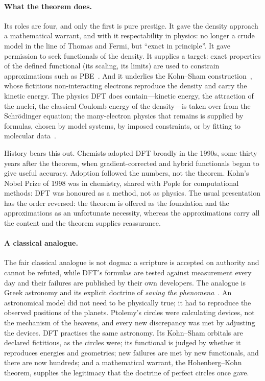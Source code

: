 \documentclass[11pt]{article}
\begin{document}
\paragraph{What the theorem does.} Its roles are four, and only the first is pure prestige. It gave the
density approach a mathematical warrant, and with it respectability in physics: no longer a crude model
in the line of Thomas and Fermi, but ``exact in principle''. It gave permission to seek functionals of the
density. It supplies a target: exact properties of the defined functional (its scaling, its limits) are
used to constrain approximations such as PBE~\cite{pbe}. And it underlies the Kohn--Sham
construction~\cite{ks}, whose fictitious non-interacting electrons reproduce the density and carry the
kinetic energy. The physics DFT does contain---kinetic energy, the attraction of the nuclei, the classical
Coulomb energy of the density---is taken over from the Schr\"odinger equation; the many-electron physics
that remains is supplied by formulas, chosen by model systems, by imposed constraints, or by fitting to
molecular data~\cite{becke}.

History bears this out. Chemists adopted DFT broadly in the 1990s, some thirty years after the theorem,
when gradient-corrected and hybrid functionals began to give useful accuracy. Adoption followed the
numbers, not the theorem. Kohn's Nobel Prize of 1998 was in chemistry, shared with Pople for
computational methods: DFT was honoured as a method, not as physics. The usual presentation has the order
reversed: the theorem is offered as the foundation and the approximations as an unfortunate necessity,
whereas the approximations carry all the content and the theorem supplies reassurance.

\paragraph{A classical analogue.} The fair classical analogue is not dogma: a scripture is accepted on
authority and cannot be refuted, while DFT's formulas are tested against measurement every day and their
failures are published by their own developers. The analogue is Greek astronomy and its explicit doctrine
of \emph{saving the phenomena}~\cite{duhem}. An astronomical model did not need to be physically true; it
had to reproduce the observed positions of the planets. Ptolemy's circles were calculating devices, not
the mechanism of the heavens, and every new discrepancy was met by adjusting the devices. DFT practises
the same astronomy. Its Kohn--Sham orbitals are declared fictitious, as the circles were; its functional
is judged by whether it reproduces energies and geometries; new failures are met by new functionals, and
there are now hundreds; and a mathematical warrant, the Hohenberg--Kohn theorem, supplies the legitimacy
that the doctrine of perfect circles once gave.
\end{document}
